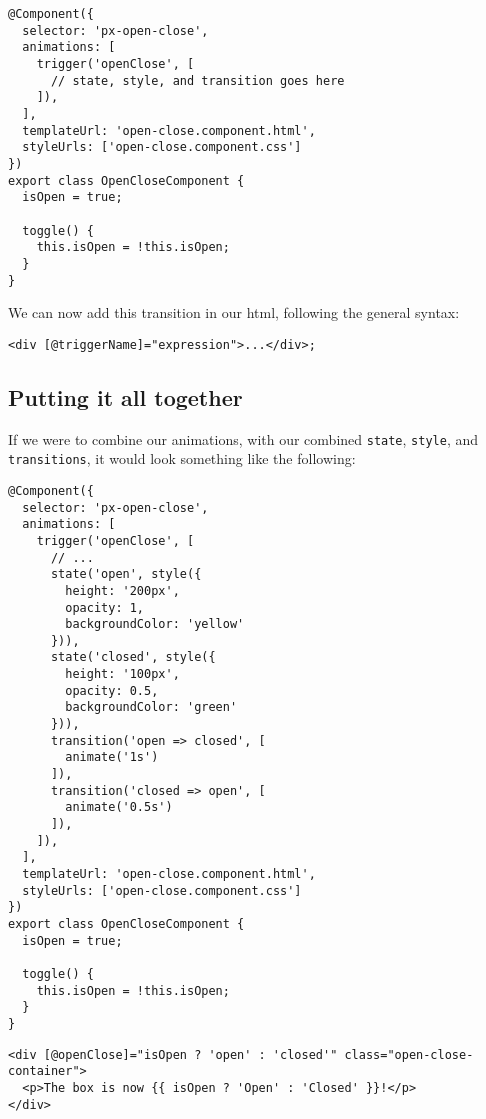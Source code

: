 \begin{lstlisting}[caption=open-close.component.ts]
@Component({
  selector: 'px-open-close',
  animations: [
    trigger('openClose', [
      // state, style, and transition goes here
    ]),
  ],
  templateUrl: 'open-close.component.html',
  styleUrls: ['open-close.component.css']
})
export class OpenCloseComponent {
  isOpen = true;

  toggle() {
    this.isOpen = !this.isOpen;
  }
}
\end{lstlisting}

We can now add this transition in our html, following the general syntax: 
\begin{lstlisting}[caption=*.html]
<div [@triggerName]="expression">...</div>;
\end{lstlisting}

\subsection{ Putting it all together }
If we were to combine our animations, with our combined \lstinline{state}, 
\lstinline{style}, and \lstinline{transitions}, it would look something like 
the following:
\begin{lstlisting}[caption=open-close.component.ts]
@Component({
  selector: 'px-open-close',
  animations: [
    trigger('openClose', [
      // ...
      state('open', style({
        height: '200px',
        opacity: 1,
        backgroundColor: 'yellow'
      })),
      state('closed', style({
        height: '100px',
        opacity: 0.5,
        backgroundColor: 'green'
      })),
      transition('open => closed', [
        animate('1s')
      ]),
      transition('closed => open', [
        animate('0.5s')
      ]),
    ]),
  ],
  templateUrl: 'open-close.component.html',
  styleUrls: ['open-close.component.css']
})
export class OpenCloseComponent {
  isOpen = true;

  toggle() {
    this.isOpen = !this.isOpen;
  }
}
\end{lstlisting}

\begin{lstlisting}[caption=open-close.component.html]
<div [@openClose]="isOpen ? 'open' : 'closed'" class="open-close-container">
  <p>The box is now {{ isOpen ? 'Open' : 'Closed' }}!</p>
</div>
\end{lstlisting}
